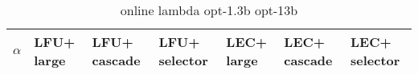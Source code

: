 \begin{table}[ht]
\begin{center}
\begin{tabular}{ cp{3.2em}p{3.2em}p{3.2em}p{3.2em}p{3.2em}p{3.2em} }
  \toprule
  $\alpha$ &  LFU+ large & LFU+ cascade & LFU+ selector & LEC+ large & LEC+ cascade & LEC+ selector \\ 
  \bottomrule
\end{tabular}
\end{center}
\caption{online lambda opt-1.3b opt-13b}
\label{tab:online_lambda_opt-1.3b_opt-13b}
\end{table}
